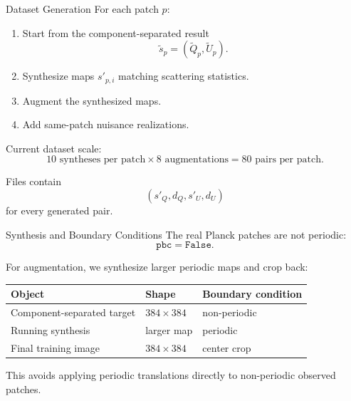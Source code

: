 \documentclass[10pt,aspectratio=169]{beamer}
\newcommand{\synth}{s'}
\newcommand{\target}{\tilde{s}}
\begin{document}
\begin{frame}{Dataset Generation}
  For each patch \(p\):

  \begin{enumerate}
    \item Start from the component-separated result
      \[
        \target_p = (\tilde{Q}_p, \tilde{U}_p).
      \]
    \item Synthesize maps \(\synth_{p,i}\) matching scattering statistics.
    \item Augment the synthesized maps.
    \item Add same-patch nuisance realizations.
  \end{enumerate}

  \vspace{0.4em}
  Current dataset scale:
  \[
    10 \text{ syntheses per patch}
    \times
    8 \text{ augmentations}
    =
    80 \text{ pairs per patch}.
  \]

  Files contain
  \[
    (\synth_Q, d_Q, \synth_U, d_U)
  \]
  for every generated pair.
\end{frame}

\begin{frame}{Synthesis and Boundary Conditions}
  The real Planck patches are not periodic:
  \[
    \texttt{pbc} = \texttt{False}.
  \]

  \vspace{0.5em}
  For augmentation, we synthesize larger periodic maps and crop back:

  \begin{center}
  \begin{tabular}{lll}
    \toprule
    Object & Shape & Boundary condition \\
    \midrule
    Component-separated target & \(384 \times 384\) & non-periodic \\
    Running synthesis & larger map & periodic \\
    Final training image & \(384 \times 384\) & center crop \\
    \bottomrule
  \end{tabular}
  \end{center}

  \vspace{0.5em}
  This avoids applying periodic translations directly to non-periodic observed patches.
\end{frame}
\end{document}
